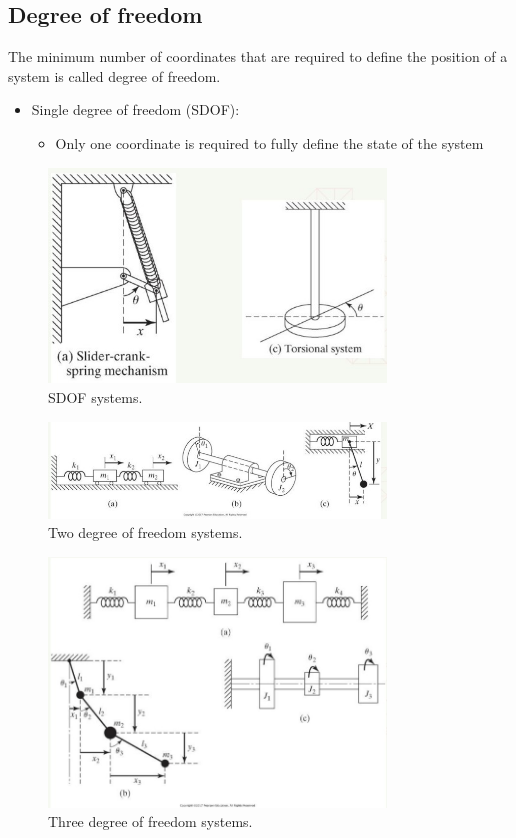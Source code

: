 \subsection{Degree of freedom}
The minimum number of coordinates that are required to define the position of a system is called degree of freedom.
\begin{itemize}
    \item Single degree of freedom (SDOF):
          \begin{itemize}
              \item Only one coordinate is required to fully define the state of the system
          \end{itemize}
\end{itemize}
\begin{figure}[H]
    \centering
    \includegraphics[width = 0.8\textwidth]{./img/diagram3.jpg}
    \caption{SDOF systems.}
\end{figure}
\begin{figure}[H]
    \centering
    \includegraphics[width = 0.8\textwidth]{./img/diagram4.jpg}
    \caption{Two degree of freedom systems.}
\end{figure}
\begin{figure}[H]
    \centering
    \includegraphics[width = 0.8\textwidth]{./img/diagram5.jpg}
    \caption{Three degree of freedom systems.}
\end{figure}

